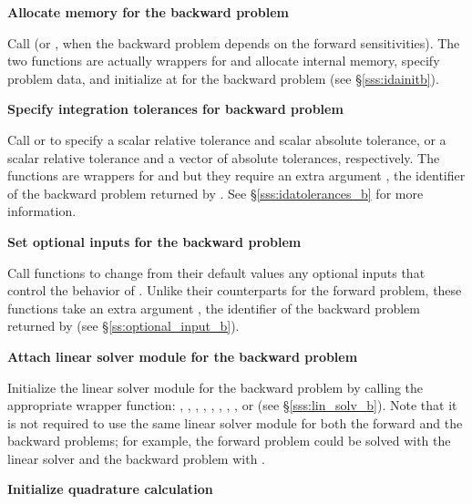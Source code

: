 \begin{Steps}
\item
  {\bf Allocate memory for the backward problem}

  Call  (or , when the backward problem depends on the
  forward sensitivities). The two functions are actually wrappers for  
  and allocate internal memory, specify problem data, and initialize {\idas} 
  at  for the backward problem (see \S\ref{sss:idainitb}).

\item 
  {\bf Specify integration tolerances for backward problem}
  
  Call  or 
  to specify a scalar relative tolerance and scalar absolute tolerance, or a
  scalar relative tolerance and a vector of absolute tolerances, respectively.
  The functions are wrappers for  and
   but they require an extra argument ,
  the identifier of the backward problem returned by .
  See \S\ref{sss:idatolerances_b} for more information.


\item
  {\bf Set optional inputs for the backward problem}

  Call  functions to change from their default values
  any optional inputs that control the behavior of {\idas}. Unlike
  their counterparts for the forward problem, these functions take an
  extra argument , the identifier of the backward problem returned 
  by  (see \S\ref{ss:optional_input_b}).


\item \label{i:lin_solverB}
  {\bf Attach linear solver module for the backward problem}

  Initialize the linear solver module 
  for the backward problem by calling the appropriate wrapper
  function: , , , ,
  , , , , or
   (see \S\ref{sss:lin_solv_b}).  
  Note that it is not required to use the same linear solver module for both the forward 
  and the backward problems; for example, the forward problem could be solved
  with the {\idadense} linear solver and the backward problem with {\idaspgmr}.

\item \label{i:quadB}
  {\bf Initialize quadrature calculation}


\end{Steps}
